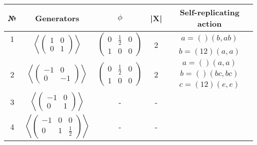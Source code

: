 \documentclass[a4paper,12pt]{amsart}
\theoremstyle{definition}
\begin{document}
	\begin{table}[H]
		\begin{tabular}{|c|c|c|c|c|}
			\hline
			№ & \textbf{Generators} &  \textbf{$\phi$} & \textbf{|X|} & Self-replicating action \\
			\hline 
			
			
			1 & \multirow{2}{*}{$\left\langle 
				\begin{pmatrix}
					1 & 0 \\ 
					0 & 1 
				\end{pmatrix} 			
				\right\rangle$
			}
			& \multirow{2}{*}{$\left(\begin{array}{cc|c}
					0 & \frac{1}{2} & 0\\ 
					1 & 0  & 0
				\end{array}\right)$  
			}
			& \multirow{2}{*}{2} & $a = () (b, ab) $\\
			
			&  & & & $b = (12)(a, a)$      \\
			
			\multirow{3}{*}{2} & \multirow{3}{*}{$\left\langle 
				\begin{pmatrix}
					-1 & 0 \\ 
					0 & -1 
				\end{pmatrix} 			
				\right\rangle$
			}
			& \multirow{3}{*}{$\left(\begin{array}{cc|c}
					0 & \frac{1}{2}  & 0\\ 
					1 & 0  & 0
				\end{array}\right)$  
			}
			& \multirow{3}{*}{2} & $a = () (a, a)$\\
			& & & & $b = ()(bc, bc)$\\
			& & & & $c = (12)(e, e)$\\
			
			3 & $\left\langle 
			\begin{pmatrix}
				-1 & 0 \\ 
				0 & 1 
			\end{pmatrix} 			
			\right\rangle$
			
			& -
			& - & \\
			
			4 & $\left\langle 
			\left(\begin{array}{cc|c}
				-1 & 0  & 0 \\ 
				0 & 1   & \frac{1}{2}
			\end{array}\right) 			
			\right\rangle$
			
			& -
			& -  & \\	
			

\end{tabular}
\end{table}
\end{document}
